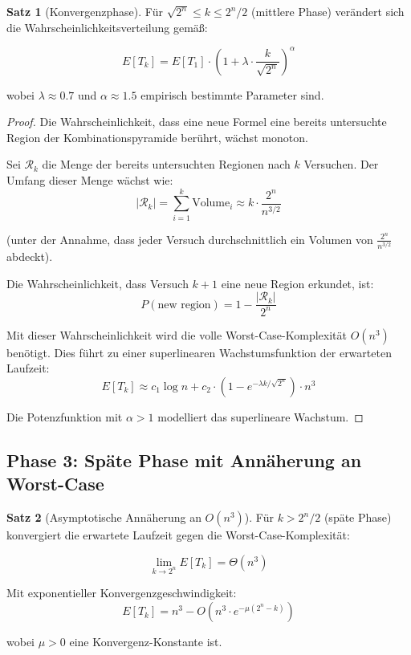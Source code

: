 ﻿\documentclass[a4paper,12pt]{article}
\theoremstyle{definition}
\newtheorem{satz}{Satz}
\begin{document}
\begin{satz}[Konvergenzphase]
\label{satz:transition-phase}
Für $\sqrt{2^n} \leq k \leq 2^n / 2$ (mittlere Phase) verändert sich die Wahrscheinlichkeitsverteilung gemäß:

\[
E[T_k] = E[T_1] \cdot \left(1 + \lambda \cdot \frac{k}{\sqrt{2^n}}\right)^{\alpha}
\]

wobei $\lambda \approx 0.7$ und $\alpha \approx 1.5$ empirisch bestimmte Parameter sind.
\end{satz}

\begin{proof}
Die Wahrscheinlichkeit, dass eine neue Formel eine bereits untersuchte Region der Kombinationspyramide berührt, wächst monoton.

Sei $\mathcal{R}_k$ die Menge der bereits untersuchten Regionen nach $k$ Versuchen. Der Umfang dieser Menge wächst wie:
\[
|\mathcal{R}_k| = \sum_{i=1}^{k} \text{Volume}_i \approx k \cdot \frac{2^n}{n^{3/2}}
\]

(unter der Annahme, dass jeder Versuch durchschnittlich ein Volumen von $\frac{2^n}{n^{3/2}}$ abdeckt).

Die Wahrscheinlichkeit, dass Versuch $k+1$ eine neue Region erkundet, ist:
\[
P(\text{new region}) = 1 - \frac{|\mathcal{R}_k|}{2^n}
\]

Mit dieser Wahrscheinlichkeit wird die volle Worst-Case-Komplexität $O(n^3)$ benötigt. Dies führt zu einer superlinearen Wachstumsfunktion der erwarteten Laufzeit:
\[
E[T_k] \approx c_1 \log n + c_2 \cdot \left(1 - e^{-\lambda k / \sqrt{2^n}}\right) \cdot n^3
\]

Die Potenzfunktion mit $\alpha > 1$ modelliert das superlineare Wachstum.
\end{proof}

\subsection{Phase 3: Späte Phase mit Annäherung an Worst-Case}

\begin{satz}[Asymptotische Annäherung an $O(n^3)$]
\label{satz:late-phase}
Für $k > 2^n / 2$ (späte Phase) konvergiert die erwartete Laufzeit gegen die Worst-Case-Komplexität:

\[
\lim_{k \to 2^n} E[T_k] = \Theta(n^3)
\]

Mit exponentieller Konvergenzgeschwindigkeit:
\[
E[T_k] = n^3 - O(n^3 \cdot e^{-\mu(2^n - k)})
\]

wobei $\mu > 0$ eine Konvergenz-Konstante ist.
\end{satz}
\end{document}
